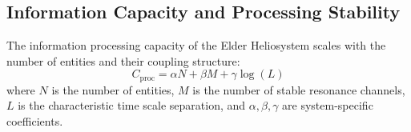 \subsection{Information Capacity and Processing Stability}

\begin{theorem}
The information processing capacity of the Elder Heliosystem scales with the number of entities and their coupling structure:
\begin{equation}
C_{\text{proc}} = \alpha N + \beta M + \gamma \log(L)
\end{equation}
where $N$ is the number of entities, $M$ is the number of stable resonance channels, $L$ is the characteristic time scale separation, and $\alpha, \beta, \gamma$ are system-specific coefficients.
\end{theorem}

